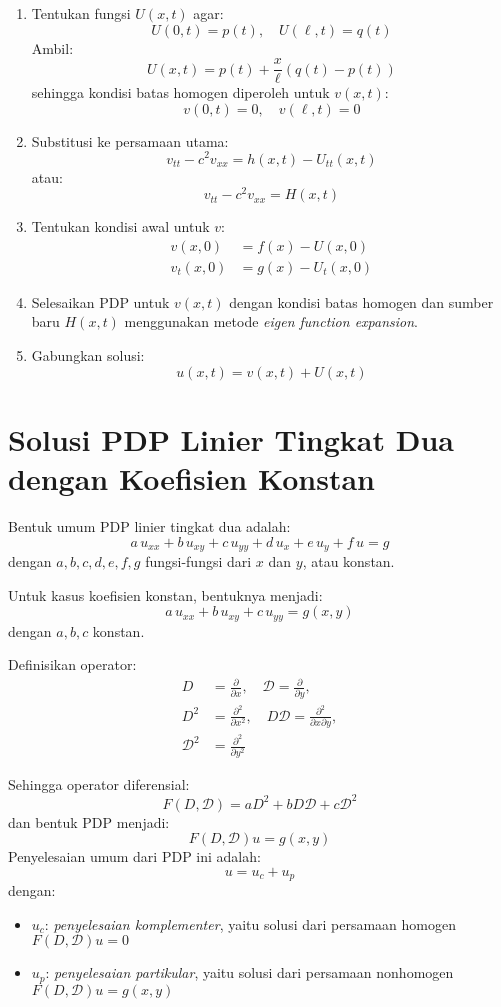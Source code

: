 \documentclass[a4paper,extrafontsizes, 9pt]{memoir}
\begin{document}
\begin{multicols}{3}
\begin{enumerate}
    \item Tentukan fungsi $U(x,t)$ agar:
    \[
    U(0,t) = p(t), \quad U(\ell,t) = q(t)
    \]
    Ambil:
    \[
    U(x,t) = p(t) + \frac{x}{\ell} \left(q(t) - p(t)\right)
    \]
    sehingga kondisi batas homogen diperoleh untuk $v(x,t)$:
    \[
    v(0,t) = 0, \quad v(\ell,t) = 0
    \]
    
    \item Substitusi ke persamaan utama:
    \[
    v_{tt} - c^2 v_{xx} = h(x,t) - U_{tt}(x,t)
    \]
    atau:
    \[
    v_{tt} - c^2 v_{xx} = H(x,t)
    \]
    
    \item Tentukan kondisi awal untuk $v$:
    \begin{align*}
        v(x,0) &= f(x) - U(x,0) \\
        v_t(x,0) &= g(x) - U_t(x,0)
    \end{align*}
    
    \item Selesaikan PDP untuk $v(x,t)$ dengan kondisi batas homogen dan sumber baru $H(x,t)$ menggunakan metode \textit{eigen function expansion}.
    
    \item Gabungkan solusi:
    \[
    u(x,t) = v(x,t) + U(x,t)
    \]
\end{enumerate}
\section*{\small Solusi PDP Linier Tingkat Dua dengan Koefisien Konstan}

Bentuk umum PDP linier tingkat dua adalah:
\[
a\,u_{xx} + b\,u_{xy} + c\,u_{yy} + d\,u_x + e\,u_y + f\,u = g
\]
dengan \( a, b, c, d, e, f, g \) fungsi-fungsi dari \( x \) dan \( y \), atau konstan.

Untuk kasus koefisien konstan, bentuknya menjadi:
\[
a\,u_{xx} + b\,u_{xy} + c\,u_{yy} = g(x, y)
\]
dengan \( a, b, c \) konstan.

Definisikan operator:
\begin{align*}
    D &= \frac{\partial}{\partial x}, \quad \mathcal{D} = \frac{\partial}{\partial y},\\
    D^2 &= \frac{\partial^2}{\partial x^2}, \quad D\mathcal{D} = \frac{\partial^2}{\partial x \partial y},\\
    \mathcal{D}^2 &= \frac{\partial^2}{\partial y^2}
\end{align*}

Sehingga operator diferensial:
\[
F(D, \mathcal{D}) = a D^2 + b D \mathcal{D} + c \mathcal{D}^2
\]
dan bentuk PDP menjadi:
\[
F(D, \mathcal{D}) u = g(x, y)
\]
Penyelesaian umum dari PDP ini adalah:
\[
u = u_c + u_p
\]
dengan:
\begin{itemize}
    \item \( u_c \): \textit{penyelesaian komplementer}, yaitu solusi dari persamaan homogen \( F(D, \mathcal{D}) u = 0 \)
    \item \( u_p \): \textit{penyelesaian partikular}, yaitu solusi dari persamaan nonhomogen \( F(D, \mathcal{D}) u = g(x, y) \)
\end{itemize}


\end{multicols}
\end{document}

